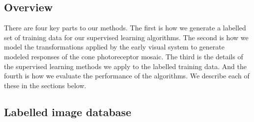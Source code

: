 \documentclass{jov}
\begin{document}
\subsection{Overview}
There are four key parts to our methods.  The first is how we generate a labelled set of training data for our supervised learning algorithms.  The second is how we model the transformations applied by the early visual system to generate modeled responses of the cone photoreceptor mosaic.  The third is the details of the supervised learning methods we apply to the labelled training data.  And the fourth is how we evaluate the performance of the algorithms.  We describe each of these in the sections below.

\subsection{Labelled image database} \label{method:VirtualWorld}
\end{document}
